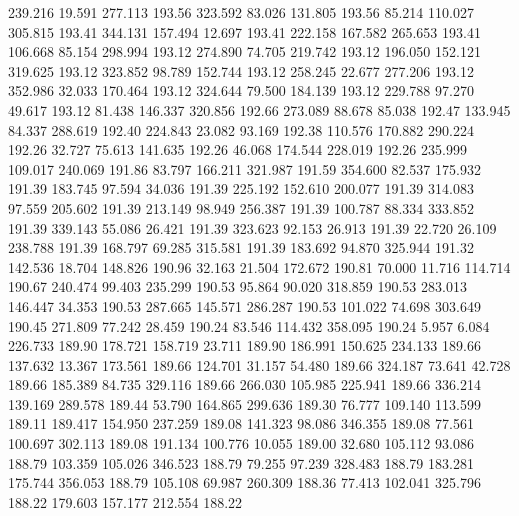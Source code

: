  239.216   19.591  277.113       193.56
 323.592   83.026  131.805       193.56
  85.214  110.027  305.815       193.41
 344.131  157.494   12.697       193.41
 222.158  167.582  265.653       193.41
 106.668   85.154  298.994       193.12
 274.890   74.705  219.742       193.12
 196.050  152.121  319.625       193.12
 323.852   98.789  152.744       193.12
 258.245   22.677  277.206       193.12
 352.986   32.033  170.464       193.12
 324.644   79.500  184.139       193.12
 229.788   97.270   49.617       193.12
  81.438  146.337  320.856       192.66
 273.089   88.678   85.038       192.47
 133.945   84.337  288.619       192.40
 224.843   23.082   93.169       192.38
 110.576  170.882  290.224       192.26
  32.727   75.613  141.635       192.26
  46.068  174.544  228.019       192.26
 235.999  109.017  240.069       191.86
  83.797  166.211  321.987       191.59
 354.600   82.537  175.932       191.39
 183.745   97.594   34.036       191.39
 225.192  152.610  200.077       191.39
 314.083   97.559  205.602       191.39
 213.149   98.949  256.387       191.39
 100.787   88.334  333.852       191.39
 339.143   55.086   26.421       191.39
 323.623   92.153   26.913       191.39
  22.720   26.109  238.788       191.39
 168.797   69.285  315.581       191.39
 183.692   94.870  325.944       191.32
 142.536   18.704  148.826       190.96
  32.163   21.504  172.672       190.81
  70.000   11.716  114.714       190.67
 240.474   99.403  235.299       190.53
  95.864   90.020  318.859       190.53
 283.013  146.447   34.353       190.53
 287.665  145.571  286.287       190.53
 101.022   74.698  303.649       190.45
 271.809   77.242   28.459       190.24
  83.546  114.432  358.095       190.24
   5.957    6.084  226.733       189.90
 178.721  158.719   23.711       189.90
 186.991  150.625  234.133       189.66
 137.632   13.367  173.561       189.66
 124.701   31.157   54.480       189.66
 324.187   73.641   42.728       189.66
 185.389   84.735  329.116       189.66
 266.030  105.985  225.941       189.66
 336.214  139.169  289.578       189.44
  53.790  164.865  299.636       189.30
  76.777  109.140  113.599       189.11
 189.417  154.950  237.259       189.08
 141.323   98.086  346.355       189.08
  77.561  100.697  302.113       189.08
 191.134  100.776   10.055       189.00
  32.680  105.112   93.086       188.79
 103.359  105.026  346.523       188.79
  79.255   97.239  328.483       188.79
 183.281  175.744  356.053       188.79
 105.108   69.987  260.309       188.36
  77.413  102.041  325.796       188.22
 179.603  157.177  212.554       188.22
